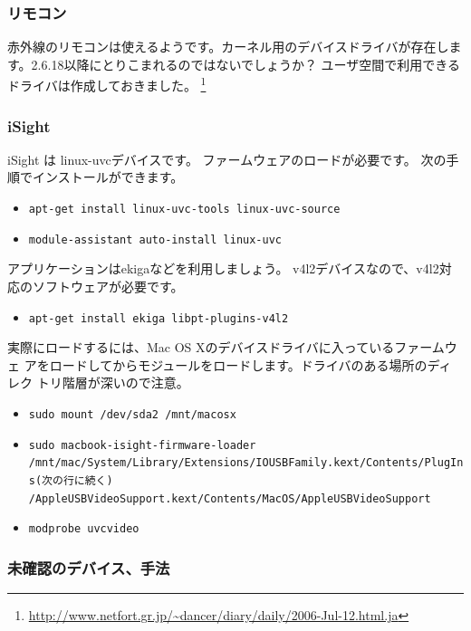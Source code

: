 \documentclass[mingoth,a4paper]{jsarticle}
\begin{document}
\subsubsection{リモコン}

赤外線のリモコンは使えるようです。カーネル用のデバイスドライバが存在しま
す。2.6.18以降にとりこまれるのではないでしょうか？
ユーザ空間で利用できるドライバは作成しておきました。
\footnote{\url{http://www.netfort.gr.jp/~dancer/diary/daily/2006-Jul-12.html.ja}}

\subsubsection{iSight}

iSight は linux-uvcデバイスです。
ファームウェアのロードが必要です。
次の手順でインストールができます。

\begin{itemize}
 \item \texttt{apt-get install linux-uvc-tools linux-uvc-source}
 \item \texttt{module-assistant auto-install linux-uvc}
\end{itemize}

アプリケーションはekigaなどを利用しましょう。
v4l2デバイスなので、v4l2対応のソフトウェアが必要です。

\begin{itemize}
 \item \texttt{apt-get install ekiga libpt-plugins-v4l2}
\end{itemize}

実際にロードするには、Mac OS Xのデバイスドライバに入っているファームウェ
アをロードしてからモジュールをロードします。ドライバのある場所のディレク
トリ階層が深いので注意。

\begin{itemize}
 \item \texttt{sudo mount /dev/sda2 /mnt/macosx}
 \item \texttt{sudo macbook-isight-firmware-loader \\
       /mnt/mac/System/Library/Extensions/IOUSBFamily.kext/Contents/PlugIns(次の行に続く)\\/AppleUSBVideoSupport.kext/Contents/MacOS/AppleUSBVideoSupport}
 \item \texttt{modprobe uvcvideo}
\end{itemize}


\subsubsection{未確認のデバイス、手法}
\end{document}
